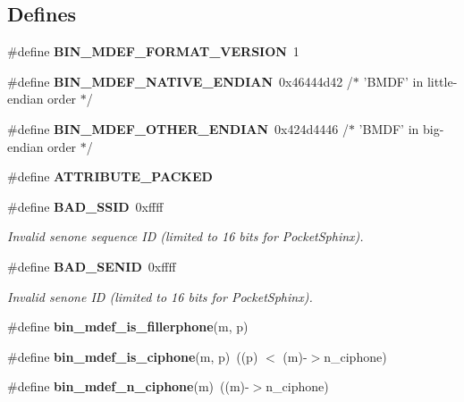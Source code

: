 \subsection*{\-Defines}
\begin{DoxyCompactItemize}
\item 
\#define {\bfseries \-B\-I\-N\-\_\-\-M\-D\-E\-F\-\_\-\-F\-O\-R\-M\-A\-T\-\_\-\-V\-E\-R\-S\-I\-O\-N}~1\label{bin__mdef_8h_a200a7e1836fa80ffe56b15334b1a8d1d}

\item 
\#define {\bfseries \-B\-I\-N\-\_\-\-M\-D\-E\-F\-\_\-\-N\-A\-T\-I\-V\-E\-\_\-\-E\-N\-D\-I\-A\-N}~0x46444d42 /$\ast$ '\-B\-M\-D\-F' in little-\/endian order $\ast$/\label{bin__mdef_8h_a9d58ffda11ea44f2681848072cb64ddd}

\item 
\#define {\bfseries \-B\-I\-N\-\_\-\-M\-D\-E\-F\-\_\-\-O\-T\-H\-E\-R\-\_\-\-E\-N\-D\-I\-A\-N}~0x424d4446  /$\ast$ '\-B\-M\-D\-F' in big-\/endian order $\ast$/\label{bin__mdef_8h_aafe4efcf837bc5c4b2392cd7e77c1ebd}

\item 
\#define {\bfseries \-A\-T\-T\-R\-I\-B\-U\-T\-E\-\_\-\-P\-A\-C\-K\-E\-D}\label{bin__mdef_8h_ad93e9ac33d1a9153bbea517a98260041}

\item 
\#define {\bf \-B\-A\-D\-\_\-\-S\-S\-I\-D}~0xffff\label{bin__mdef_8h_a8ee283c316e9f4aa8e6d18c1d44026bc}

\begin{DoxyCompactList}\small\item\em \-Invalid senone sequence \-I\-D (limited to 16 bits for \-Pocket\-Sphinx). \end{DoxyCompactList}\item 
\#define {\bf \-B\-A\-D\-\_\-\-S\-E\-N\-I\-D}~0xffff\label{bin__mdef_8h_ab6c771eca798ab8c94e0933a1f8daafc}

\begin{DoxyCompactList}\small\item\em \-Invalid senone \-I\-D (limited to 16 bits for \-Pocket\-Sphinx). \end{DoxyCompactList}\item 
\#define {\bfseries bin\-\_\-mdef\-\_\-is\-\_\-fillerphone}(m, p)
\item 
\#define {\bfseries bin\-\_\-mdef\-\_\-is\-\_\-ciphone}(m, p)~((p) $<$ (m)-\/$>$n\-\_\-ciphone)\label{bin__mdef_8h_ad1440dcf8f6df7daf54dca1c85b7aa9e}

\item 
\#define {\bfseries bin\-\_\-mdef\-\_\-n\-\_\-ciphone}(m)~((m)-\/$>$n\-\_\-ciphone)\label{bin__mdef_8h_a3bf9a556739b5b6651eb2bfa72fcb427}


\end{DoxyCompactItemize}
